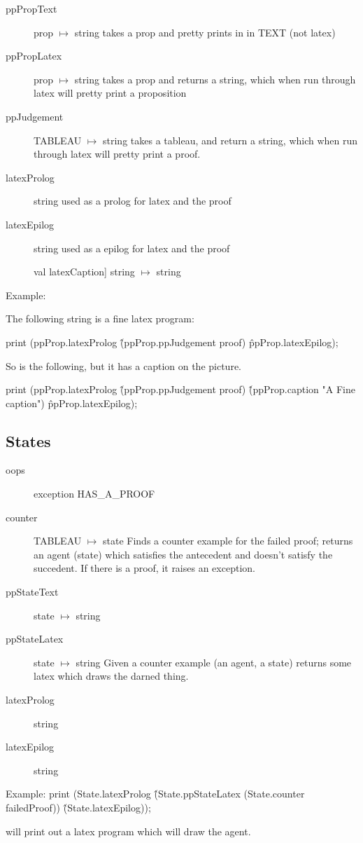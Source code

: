 \documentclass[12pt]{article}
\begin{document}
\begin{description}
\item[ppPropText] prop $\mapsto$  string
		takes a prop and pretty prints in in TEXT (not latex)

\item[ppPropLatex] prop $\mapsto$  string
		takes a prop and returns a string, which when 
		run through latex will pretty print a proposition
\item[ppJudgement] TABLEAU $\mapsto$ string
		takes a tableau, and return a string, which when
		run through latex will pretty print a proof.

\item[latexProlog] string	used as a prolog for latex and the proof

\item[latexEpilog] string	used as a epilog for latex and the proof

val latexCaption] string $\mapsto$ string
\end{description}

Example:

The following string is a fine latex program:

print (ppProp.latexProlog \^ (ppProp.ppJudgement proof) \^ ppProp.latexEpilog);

So is the following, but it has a caption on the picture.

print (ppProp.latexProlog \^ (ppProp.ppJudgement proof) \^ 
		(ppProp.caption "A Fine caption") \^ ppProp.latexEpilog);



\subsection{States}

\begin{description}
\item[oops]  exception HAS\_A\_PROOF
\item[counter] TABLEAU $\mapsto$ state
	Finds a counter example for the failed proof;
	returns an agent (state) which satisfies the antecedent and doesn't
	satisfy the succedent.  If there is a proof, it raises an exception.
\item[ppStateText] state $\mapsto$ string
\item[ppStateLatex] state $\mapsto$ string
		Given a counter example (an agent, a state) returns
		some latex which draws the darned thing.
\item[latexProlog] string
\item[latexEpilog] string
\end{description}


Example:
print (State.latexProlog \^ (State.ppStateLatex (State.counter failedProof))
	\^ (State.latexEpilog));

will print out a latex program which will draw the agent.
\end{document}
